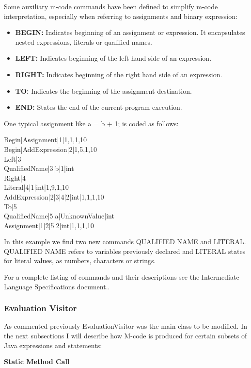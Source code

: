 Some auxiliary m-code commands have been defined to simplify m-code interpretation, especially when referring to assignments and binary expression:

\begin{itemize}
\item {\bf{BEGIN:}} Indicates beginning of an assignment or expression. It encapsulates nested expressions, literals or qualified names.
\item {\bf{LEFT:}} Indicates beginning of the left hand side of an expression.
\item {\bf{RIGHT:}} Indicates beginning of the right hand side of an expression.
\item {\bf{TO:}} Indicates the beginning of the assignment destination.
\item {\bf{END:}}  States the end of the current program execution.
\end{itemize}

One typical assignment like a = b + 1; is coded as follows:

Begin|Assignment|1|1,1,1,10\\
Begin|AddExpression|2|1,5,1,10\\
Left|3\\
QualifiedName|3|b|1|int\\
Right|4\\
Literal|4|1|int|1,9,1,10\\
AddExpression|2|3|4|2|int|1,1,1,10\\
To|5\\
QualifiedName|5|a|UnknownValue|int\\
Assignment|1|2|5|2|int|1,1,1,10

In this example we find two new commands QUALIFIED NAME and LITERAL. QUALIFIED NAME refers to variables previously declared and LITERAL states for literal values, as numbers, characters or strings.

For a complete listing of commands and their descriptions see the Intermediate Language Specifications document..


\subsubsection{Evaluation Visitor}
As commented previously EvaluationVisitor was the main class to be modified. In the next subsections I will describe how M-code is produced for certain subsets of Java expressions and statements:

{\bf{Static Method Call}}

